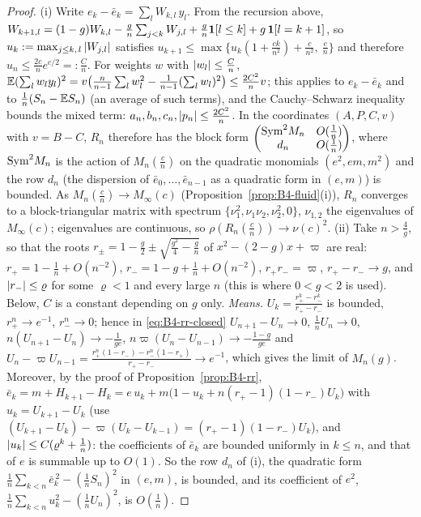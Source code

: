 \begin{proof}
(i) Write $e_k-\bar e_k=\sum_lW_{k,l}\,y_l$. From the recursion above, $W_{k+1,l}=(1-g)W_{k,l}-\frac gn\sum_{j<k}W_{j,l}+\frac gn\mathbf{1}[l\le k]+g\,\mathbf{1}[l=k+1]$, so $u_k:=\max_{j\le k,\,l}\left|W_{j,l}\right|$ satisfies $u_{k+1}\le\max\{u_k(1+\frac{ck}{n^2})+\frac c{n^2},\ \frac cn\}$ and therefore $u_n\le\frac{2c}ne^{c/2}=:\frac{C}n$. For weights $w$ with $\left|w_l\right|\le\frac Cn$, $\mathbb{E}(\sum_lw_ly_l)^2=v\big(\frac n{n-1}\sum_lw_l^2-\frac1{n-1}(\sum_lw_l)^2\big)\le\frac{2C^2}nv$; this applies to $e_k-\bar e_k$ and to $\frac1n(S_n-\mathbb{E} S_n)$ (an average of such terms), and the Cauchy--Schwarz inequality bounds the mixed term: $a_n,b_n,c_n,\left|p_n\right|\le\frac{2C^2}n$. In the coordinates $(A,P,C,v)$ with $v=B-C$, $R_n$ therefore has the block form $\begin{pmatrix}{\rm Sym}^2M_n&O(\frac1n)\\ d_n&O(\frac1n)\end{pmatrix}$, where ${\rm Sym}^2M_n$ is the action of $M_n(\frac cn)$ on the quadratic monomials $(e^2,em,m^2)$ and the row $d_n$ (the dispersion of $\bar e_0,\dots,\bar e_{n-1}$ as a quadratic form in $(e,m)$) is bounded. As $M_n(\frac cn)\to M_\infty(c)$ (Proposition~\ref{prop:B4-fluid}(i)), $R_n$ converges to a block-triangular matrix with spectrum $\{\nu_1^2,\nu_1\nu_2,\nu_2^2,0\}$, $\nu_{1,2}$ the eigenvalues of $M_\infty(c)$; eigenvalues are continuous, so $\rho(R_n(\frac cn))\to\nu(c)^2$.
(ii) Take $n>\frac4g$, so that the roots $r_\pm=1-\frac g2\pm\sqrt{\frac{g^2}4-\frac gn}$ of $x^2-(2-g)x+\varpi$ are real: $r_+=1-\frac1n+O(n^{-2})$, $r_-=1-g+\frac1n+O(n^{-2})$, $r_+r_-=\varpi$, $r_+-r_-\to g$, and $\left|r_-\right|\le\varrho$ for some $\varrho<1$ and every large $n$ (this is where $0<g<2$ is used). Below, $C$ is a constant depending on $g$ only.
\emph{Means.} $U_k=\frac{r_+^k-r_-^k}{r_+-r_-}$ is bounded, $r_+^n\to e^{-1}$, $r_-^n\to0$; hence in \eqref{eq:B4-rr-closed} $U_{n+1}-U_n\to0$, $\frac1nU_n\to0$, $n(U_{n+1}-U_n)\to-\frac1{ge}$, $n\varpi(U_n-U_{n-1})\to-\frac{1-g}{ge}$ and $U_n-\varpi U_{n-1}=\frac{r_+^n(1-r_-)-r_-^n(1-r_+)}{r_+-r_-}\to e^{-1}$, which gives the limit of $M_n(g)$. Moreover, by the proof of Proposition~\ref{prop:B4-rr}, $\bar e_k=m+H_{k+1}-H_k=e\,u_k+m\big(1-u_k+n(r_+-1)(1-r_-)U_k\big)$ with $u_k=U_{k+1}-U_k$ (use $(U_{k+1}-U_k)-\varpi(U_k-U_{k-1})=(r_+-1)(1-r_-)U_k$), and $\left|u_k\right|\le C(\varrho^k+\frac1n)$: the coefficients of $\bar e_k$ are bounded uniformly in $k\le n$, and that of $e$ is summable up to $O(1)$. So the row $d_n$ of (i), the quadratic form $\frac1n\sum_{k<n}\bar e_k^{\,2}-(\frac1nS_n)^2$ in $(e,m)$, is bounded, and its coefficient of $e^2$, $\frac1n\sum_{k<n}u_k^2-(\frac1nU_n)^2$, is $O(\frac1n)$.

\end{proof}
